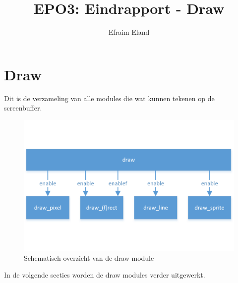 \documentclass{scrartcl} %
\author{Efraim Eland}
\title{EPO3: Eindrapport - Draw}
\begin{document}
\chapter{Draw}
\label{ch:draw}

Dit is de verzameling van alle modules die wat kunnen tekenen op de screenbuffer.

\begin{figure}[H]
	\centering
	\includegraphics[width=\textwidth]{resource/draw.png}
	\caption{Schematisch overzicht van de draw module}
	\label{fig:draw}
\end{figure}

In de volgende secties worden de draw modules verder uitgewerkt.
\end{document}
